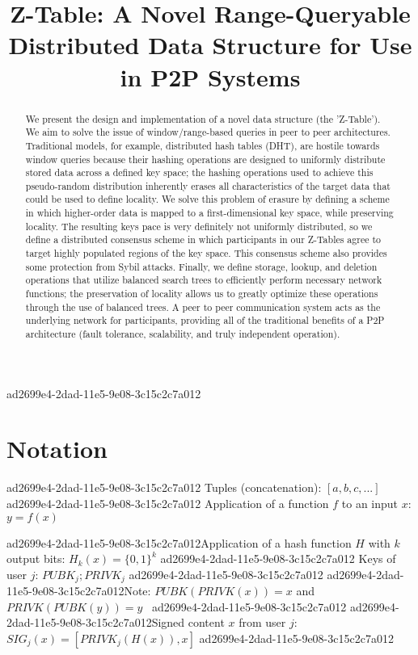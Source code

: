 \documentclass[12pt]{article}
\title{Z-Table: A Novel Range-Queryable Distributed Data Structure for Use in P2P Systems}
\begin{document}
\maketitle

\begin{abstract}
We present the design and implementation of a novel data structure (the 'Z-Table'). We aim to solve the issue of window/range-based queries in peer to peer architectures. Traditional models, for example,  distributed hash tables (DHT), are hostile towards window queries because their hashing operations are designed to uniformly distribute stored data across a defined key space; the hashing operations used to achieve this pseudo-random distribution inherently erases all characteristics of the target data that could be used to define locality. We solve this problem of erasure by defining a scheme in which higher-order data is mapped to a first-dimensional key space, while preserving locality. The resulting keys pace is very definitely not uniformly distributed, so we define a distributed consensus scheme in which participants in our Z-Tables agree to target highly populated regions of the key space. This consensus scheme also provides some protection from Sybil attacks. Finally, we define storage, lookup, and deletion operations that utilize balanced search trees to efficiently perform necessary network functions; the preservation of locality allows us to greatly optimize these operations through the use of balanced trees. A peer to peer communication system acts as the underlying network for participants, providing all of the traditional benefits of a P2P architecture (fault tolerance, scalability, and truly independent operation).
\end{abstract}

ad2699e4-2dad-11e5-9e08-3c15c2c7a012\section{Notation}
ad2699e4-2dad-11e5-9e08-3c15c2c7a012
Tuples (concatenation): $[a,b,c,...]$
ad2699e4-2dad-11e5-9e08-3c15c2c7a012
Application of a function $f$ to an input $x$: $y=f(x)$

ad2699e4-2dad-11e5-9e08-3c15c2c7a012Application of a hash function $H$ with $k$ output bits: $H_{k}(x) = \{0,1\}^k$
ad2699e4-2dad-11e5-9e08-3c15c2c7a012
Keys of user $j$: $ PUBK_j; PRIVK_j $
ad2699e4-2dad-11e5-9e08-3c15c2c7a012
ad2699e4-2dad-11e5-9e08-3c15c2c7a012Note: $PUBK(PRIVK(x)) = x$ and $PRIVK(PUBK(y)) = y$~
ad2699e4-2dad-11e5-9e08-3c15c2c7a012
ad2699e4-2dad-11e5-9e08-3c15c2c7a012Signed content $x$ from user $j$: $SIG_j(x) = \left[ PRIVK_j( H(x) ), x \right]$
ad2699e4-2dad-11e5-9e08-3c15c2c7a012
\end{document}
